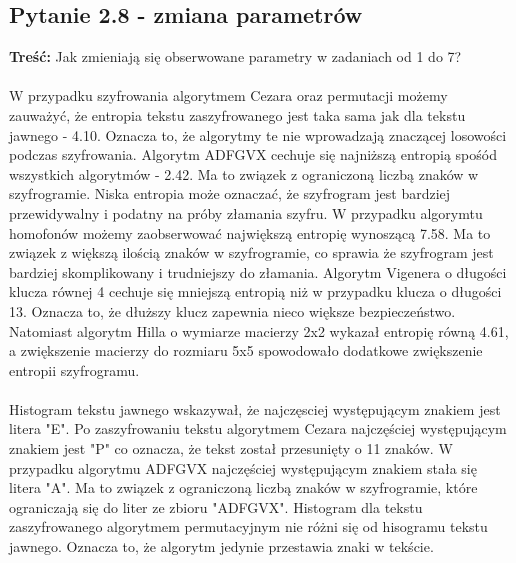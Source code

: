 \documentclass{article}
\begin{document}
\subsection*{Pytanie 2.8 - zmiana parametrów}
\textbf{Treść: } Jak zmieniają się obserwowane parametry w zadaniach od 1 do 7?\\\\
W przypadku szyfrowania algorytmem Cezara oraz permutacji możemy zauważyć, że entropia tekstu zaszyfrowanego jest taka sama jak dla tekstu jawnego - 4.10.
Oznacza to, że algorytmy te nie wprowadzają znaczącej losowości podczas szyfrowania. Algorytm ADFGVX cechuje się najniższą entropią spośód wszystkich algorytmów - 2.42.
Ma to związek z ograniczoną liczbą znaków w szyfrogramie. Niska entropia może oznaczać, że szyfrogram jest bardziej przewidywalny i podatny na próby złamania szyfru.
W przypadku algorymtu homofonów możemy zaobserwować największą entropię wynoszącą 7.58. Ma to związek z większą ilością znaków w szyfrogramie, co sprawia że szyfrogram jest bardziej skomplikowany
i trudniejszy do złamania. Algorytm Vigenera o długości klucza równej 4 cechuje się mniejszą entropią niż w przypadku klucza o długości 13. Oznacza to, że dłuższy klucz zapewnia nieco większe bezpieczeństwo.
Natomiast algorytm Hilla o wymiarze macierzy 2x2 wykazał entropię równą 4.61, a zwiększenie macierzy do rozmiaru 5x5 spowodowało dodatkowe zwiększenie entropii szyfrogramu.\\\\

Histogram tekstu jawnego wskazywał, że najczęsciej występującym znakiem jest litera "E". Po zaszyfrowaniu tekstu algorytmem Cezara najczęściej występującym
znakiem jest "P" co oznacza, że tekst został przesunięty o 11 znaków. W przypadku algorytmu ADFGVX najczęściej występującym znakiem stała się litera "A". Ma
to związek z ograniczoną liczbą znaków w szyfrogramie, które ograniczają się do liter ze zbioru "ADFGVX". Histogram dla tekstu zaszyfrowanego algorytmem permutacyjnym
nie różni się od hisogramu tekstu jawnego. Oznacza to, że algorytm jedynie przestawia znaki w tekście.
\end{document}
